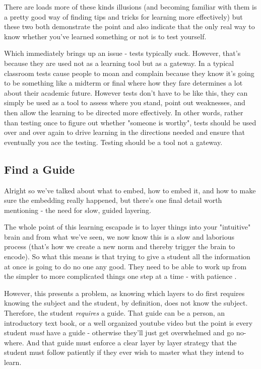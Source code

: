 \documentclass[11pt]{book}
\begin{document}
There are loads more of these kinds illusions (and becoming familiar with them is a pretty good way of finding tips and tricks for learning more effectively) but these two both demonstrate the point and also indicate that the only real way to know whether you've learned something or not is to test yourself. 
\newline

Which immediately brings up an issue - tests typically suck. However, that's because they are used not as a learning tool but as a gateway. In a typical classroom tests cause people to moan and complain because they know it's going to be something like a midterm or final where how they fare determines a lot about their academic future. However tests don't have to be like this, they can simply be used as a tool to assess where you stand, point out weaknesses, and then allow the learning to be directed more effectively. In other words, rather than testing once to figure out whether "someone is worthy", tests should be used over and over again to drive learning in the directions needed and ensure that eventually you ace the testing. Testing should be a tool not a gateway.

\subsection{Find a Guide}
Alright so we've talked about what to embed, how to embed it, and how to make sure the embedding really happened, but there's one final detail worth mentioning - the need for slow, guided layering. 
\newline

The whole point of this learning escapade is to layer things into your "intuitive" brain and from what we've seen, we now know this is a slow and laborious process (that's how we create a new norm and thereby trigger the brain to encode). So what this means is that trying to give a student all the information at once is going to do no one any good. They need to be able to work up from the simpler to more complicated things one step at a time - with patience \cite{ericsson}. 
\newline

However, this presents a problem, as knowing which layers to do first requires knowing the subject and the student, by definition, does not know the subject. Therefore, the student \textit{requires} a guide. That guide can be a person, an introductory text book, or a well organized youtube video but the point is every student \textit{must} have a guide - otherwise they'll just get overwhelmed and go no-where. And that guide must enforce a clear layer by layer strategy that the student must follow patiently if they ever wish to master what they intend to learn. 
\newline
\end{document}
